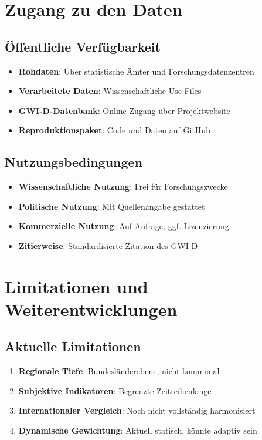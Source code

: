 \section{Zugang zu den Daten}

\subsection{Öffentliche Verfügbarkeit}

\begin{itemize}
    \item \textbf{Rohdaten}: Über statistische Ämter und Forschungsdatenzentren
    \item \textbf{Verarbeitete Daten}: Wissenschaftliche Use Files
    \item \textbf{GWI-D-Datenbank}: Online-Zugang über Projektwebsite
    \item \textbf{Reproduktionspaket}: Code und Daten auf GitHub
\end{itemize}

\subsection{Nutzungsbedingungen}

\begin{itemize}
    \item \textbf{Wissenschaftliche Nutzung}: Frei für Forschungszwecke
    \item \textbf{Politische Nutzung}: Mit Quellenangabe gestattet
    \item \textbf{Kommerzielle Nutzung}: Auf Anfrage, ggf. Lizenzierung
    \item \textbf{Zitierweise}: Standardisierte Zitation des GWI-D
\end{itemize}

\section{Limitationen und Weiterentwicklungen}

\subsection{Aktuelle Limitationen}

\begin{enumerate}
    \item \textbf{Regionale Tiefe}: Bundesländerebene, nicht kommunal
    \item \textbf{Subjektive Indikatoren}: Begrenzte Zeitreihenlänge
    \item \textbf{Internationaler Vergleich}: Noch nicht vollständig harmonisiert
    \item \textbf{Dynamische Gewichtung}: Aktuell statisch, könnte adaptiv sein
\end{enumerate}

